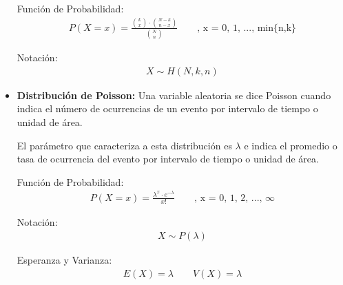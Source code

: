 \documentclass{templateNote}
\begin{document}
\begin{itemize}
  Función de Probabilidad:
  \begin{align*}
    P(X=x) = \frac{\displaystyle \binom{k}{x} \cdot \binom{N-k}{n-x}}{\displaystyle \binom{N}{n}} \qquad \text{, x = 0, 1, ..., min\{n,k\}}
  \end{align*}

  Notación:
  \begin{align*}
    X \sim H(N, k, n)
  \end{align*}

  \newpage
  \item \textbf{Distribución de Poisson:} Una variable aleatoria se dice Poisson cuando indica el número de ocurrencias de
  un evento por intervalo de tiempo o unidad de área.
  
  El parámetro que caracteriza a esta distribución es $\lambda$ e indica el promedio o tasa de ocurrencia
  del evento por intervalo de tiempo o unidad de área.

  Función de Probabilidad:
  \begin{align*}
    P(X=x) = \frac{\lambda^x \cdot e^{-\lambda}}{x!} \qquad \text{, x = 0, 1, 2, ..., } \infty
  \end{align*}

  Notación:
  \begin{align*}
    X \sim P(\lambda)
  \end{align*}

  Esperanza y Varianza:
  \begin{align*}
    E(X) = \lambda \qquad V(X) = \lambda
  \end{align*}
\end{itemize}
\end{document}
